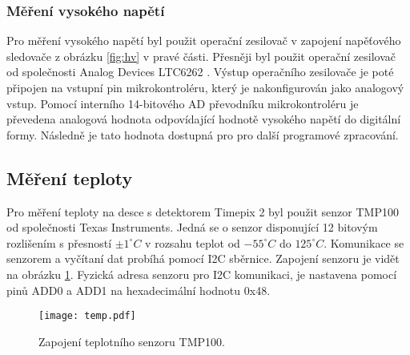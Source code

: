 	\subsubsection{Měření vysokého napětí} %
	Pro měření vysokého napětí byl použit operační zesilovač v zapojení napěťového sledovače z obrázku \ref{fig:hv} v pravé části. Přesněji byl použit operační zesilovač od společnosti Analog Devices LTC6262 \cite{LTC6252}. Výstup operačního zesilovače je poté připojen na vstupní pin mikrokontroléru, který je nakonfigurován jako analogový vstup. Pomocí interního 14-bitového AD převodníku mikrokontroléru je převedena analogová hodnota odpovídající hodnotě vysokého napětí do digitální formy. Následně je tato hodnota dostupná pro pro další programové zpracování. 

	\subsection{Měření teploty}	%
	\label{Mereni teploty}
	Pro měření teploty na desce s detektorem Timepix 2 byl použit senzor TMP100 \cite{TMP100} od společnosti Texas Instruments. Jedná se o senzor disponující 12 bitovým rozlišením s přesností $\pm 1^{\circ} C$ v rozsahu teplot od $-55^{\circ}C$ do $125^{\circ}C$. Komunikace se senzorem a vyčítaní dat probíhá pomocí I2C sběrnice. Zapojení senzoru je vidět na obrázku \ref{fig:tmp100}. Fyzická adresa senzoru pro I2C komunikaci, je nastavena pomocí pinů ADD0 a ADD1 na hexadecimální hodnotu 0x48.
	\begin{figure}[h!]
		\centering
		\captionsetup{justification=centering}
		\texttt{[image: temp.pdf]}
		\caption{Zapojení teplotního senzoru TMP100.} 
		\label{fig:tmp100}
	\end{figure} 
